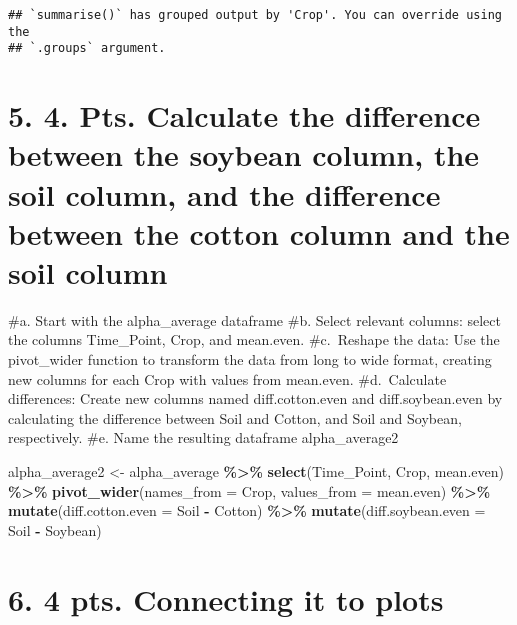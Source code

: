 \documentclass[
]{article}
\newenvironment{Shaded}{\begin{snugshade}}{\end{snugshade}}
\newcommand{\AttributeTok}[1]{\textcolor[rgb]{0.13,0.29,0.53}{#1}}
\newcommand{\FunctionTok}[1]{\textcolor[rgb]{0.13,0.29,0.53}{\textbf{#1}}}
\newcommand{\NormalTok}[1]{#1}
\newcommand{\OtherTok}[1]{\textcolor[rgb]{0.56,0.35,0.01}{#1}}
\newcommand{\SpecialCharTok}[1]{\textcolor[rgb]{0.81,0.36,0.00}{\textbf{#1}}}
\begin{document}
\begin{verbatim}
## `summarise()` has grouped output by 'Crop'. You can override using the
## `.groups` argument.
\end{verbatim}

\section{5. 4. Pts. Calculate the difference between the soybean column,
the soil column, and the difference between the cotton column and the
soil
column}\label{pts.-calculate-the-difference-between-the-soybean-column-the-soil-column-and-the-difference-between-the-cotton-column-and-the-soil-column}

\#a. Start with the alpha\_average dataframe \#b. Select relevant
columns: select the columns Time\_Point, Crop, and mean.even.
\#c.~Reshape the data: Use the pivot\_wider function to transform the
data from long to wide format, creating new columns for each Crop with
values from mean.even. \#d.~Calculate differences: Create new columns
named diff.cotton.even and diff.soybean.even by calculating the
difference between Soil and Cotton, and Soil and Soybean, respectively.
\#e. Name the resulting dataframe alpha\_average2

\begin{Shaded}
\begin{Highlighting}[]
\NormalTok{alpha\_average2 }\OtherTok{\textless{}{-}}\NormalTok{ alpha\_average }\SpecialCharTok{\%\textgreater{}\%}
              \FunctionTok{select}\NormalTok{(Time\_Point, Crop, mean.even) }\SpecialCharTok{\%\textgreater{}\%}
              \FunctionTok{pivot\_wider}\NormalTok{(}\AttributeTok{names\_from =}\NormalTok{ Crop, }\AttributeTok{values\_from =}\NormalTok{ mean.even) }\SpecialCharTok{\%\textgreater{}\%}
              \FunctionTok{mutate}\NormalTok{(}\AttributeTok{diff.cotton.even =}\NormalTok{ Soil }\SpecialCharTok{{-}}\NormalTok{ Cotton) }\SpecialCharTok{\%\textgreater{}\%}
              \FunctionTok{mutate}\NormalTok{(}\AttributeTok{diff.soybean.even =}\NormalTok{ Soil }\SpecialCharTok{{-}}\NormalTok{ Soybean)}
\end{Highlighting}
\end{Shaded}

\section{6. 4 pts. Connecting it to
plots}\label{pts.-connecting-it-to-plots}
\end{document}
